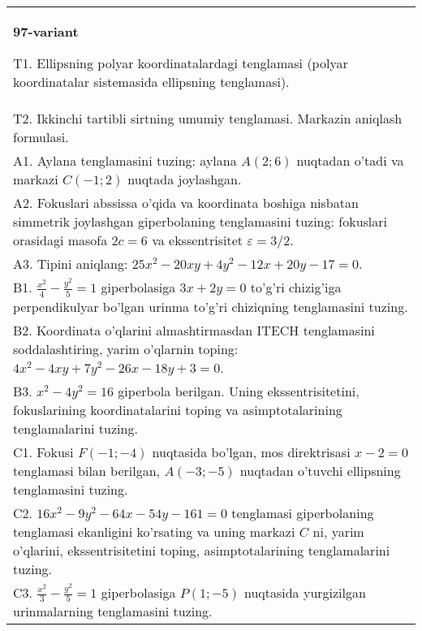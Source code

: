 \documentclass{article}
\begin{document}
\begin{tabular}{m{17cm}}
\textbf{97-variant}
\newline

T1. Ellipsning polyar koordinatalardagi tenglamasi (polyar koordinatalar sistemasida ellipsning tenglamasi).\\

T2. Ikkinchi tartibli sirtning umumiy tenglamasi. Markazin aniqlash formulasi.\\

A1. Aylana tenglamasini tuzing: aylana $A(2;6)$ nuqtadan o'tadi va markazi $C(-1;2)$ nuqtada joylashgan.\\

A2. Fokuslari abssissa o'qida va koordinata boshiga nisbatan simmetrik joylashgan giperbolaning tenglamasini tuzing: fokuslari orasidagi masofa $2c=6$ va ekssentrisitet $\varepsilon=3/2$.\\

A3. Tipini aniqlang: $25x^{2}-20xy+4y^{2}-12x+20y-17=0$.\\

B1. $\frac{x^{2}}{4} - \frac{y^{2}}{5} = 1$ giperbolasiga $3x + 2y = 0$ to'g'ri chizig'iga perpendikulyar bo'lgan urinma to'g'ri chiziqning tenglamasini tuzing.\\

B2. Koordinata o'qlarini almashtirmasdan ITECH tenglamasini soddalashtiring, yarim o'qlarnin toping: $4x^{2} - 4xy + 7y^{2} - 26x - 18y + 3 = 0$.\\

B3. $x^{2} - 4y^{2} = 16$ giperbola berilgan. Uning ekssentrisitetini, fokuslarining koordinatalarini toping va asimptotalarining tenglamalarini tuzing.\\

C1. Fokusi $F( - 1; - 4)$ nuqtasida bo'lgan, mos direktrisasi $x - 2 = 0$ tenglamasi bilan berilgan, $A( - 3; - 5)$ nuqtadan o'tuvchi ellipsning tenglamasini tuzing.  \\

C2. $16x^{2} - 9y^{2} - 64x - 54y - 161 = 0$ tenglamasi giperbolaning tenglamasi ekanligini ko'rsating va uning markazi $C$ ni, yarim o'qlarini, ekssentrisitetini toping, asimptotalarining tenglamalarini tuzing.  \\

C3. $\frac{x^{2}}{3} - \frac{y^{2}}{5} = 1$ giperbolasiga $P(1; - 5)$ nuqtasida yurgizilgan urinmalarning tenglamasini tuzing.\\

\end{tabular}
\vspace{1cm}
\end{document}
